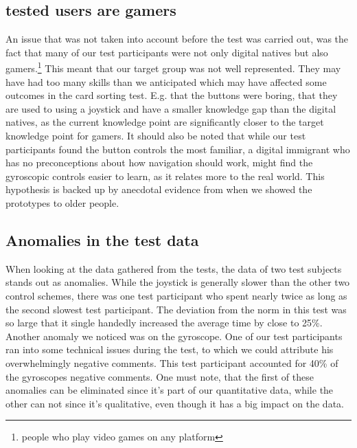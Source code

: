 \subsection*{tested users are gamers} \label{TestedUsersAreGamers}
An issue that was not taken into account before the test was carried out, was the fact that many of our test participants were not only digital natives but also gamers.\footnote{people  who play video games on any platform} This meant that our target group was not well represented. They may have had too many skills than we anticipated which may have affected some outcomes in the card sorting test. E.g. that the buttons were boring, that they are used to using a joystick and have a smaller knowledge gap than the digital natives, as the current knowledge point are significantly closer to the target knowledge point for gamers. 
It should also be noted that while our test participants found the button controls the most familiar, a digital immigrant who has no preconceptions about how navigation should work, might find the gyroscopic controls easier to learn, as it relates more to the real world. This hypothesis is backed up by anecdotal evidence from when we showed the prototypes to older people. 
\subsection*{Anomalies in the test data}
When looking at the data gathered from the tests, the data of two test subjects stands out as anomalies. While the joystick is generally slower than the other two control schemes, there was one test participant who spent nearly twice as long as the second slowest test participant. 
The deviation from the norm in this test was so large that it single handedly increased the average time by close to 25\%.
Another anomaly we noticed was on the gyroscope. One of our test participants ran into some technical issues during the test, to which we could attribute his overwhelmingly negative comments. This test participant accounted for 40\% of the gyroscopes negative comments.
One must note, that the first of these anomalies can be eliminated since it's part of our quantitative data, while the other can not since it's qualitative, even though it has a big impact on the data. %

